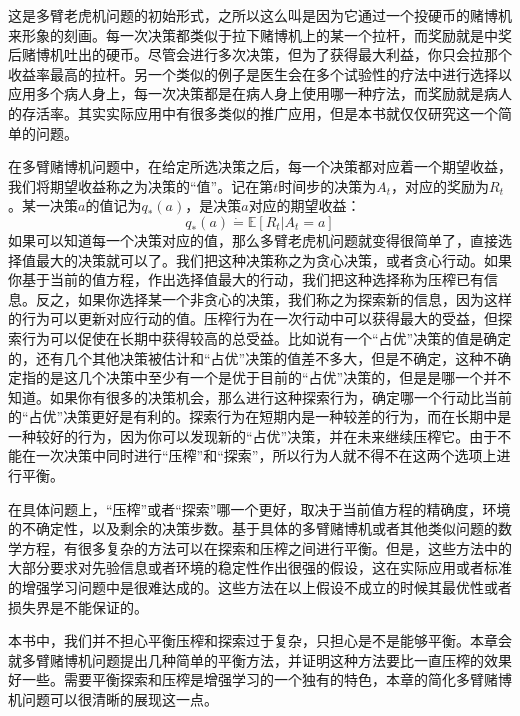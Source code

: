\documentclass{ctexart}
\begin{document}
            这是多臂老虎机问题的初始形式，之所以这么叫是因为它通过一个投硬币的赌博机来形象的刻画。每一次决策都类似于拉下赌博机上的某一个拉杆，而奖励就是中奖后赌博机吐出的硬币。尽管会进行多次决策，但为了获得最大利益，你只会拉那个收益率最高的拉杆。另一个类似的例子是医生会在多个试验性的疗法中进行选择以应用多个病人身上，每一次决策都是在病人身上使用哪一种疗法，而奖励就是病人的存活率。其实实际应用中有很多类似的推广应用，但是本书就仅仅研究这一个简单的问题。

            在多臂赌博机问题中，在给定所选决策之后，每一个决策都对应着一个期望收益，我们将期望收益称之为决策的“值”。记在第$t$时间步的决策为$A_t$，对应的奖励为$R_t$。某一决策$a$的值记为$q_{*}(a)$，是决策$a$对应的期望收益：
            \begin{equation}
                q_{*}(a)\dot{=}\mathbb{E}[R_t|A_t=a]
                \label{e_2}
            \end{equation}
            如果可以知道每一个决策对应的值，那么多臂老虎机问题就变得很简单了，直接选择值最大的决策就可以了。我们把这种决策称之为贪心决策，或者贪心行动。如果你基于当前的值方程，作出选择值最大的行动，我们把这种选择称为压榨已有信息。反之，如果你选择某一个非贪心的决策，我们称之为探索新的信息，因为这样的行为可以更新对应行动的值。压榨行为在一次行动中可以获得最大的受益，但探索行为可以促使在长期中获得较高的总受益。比如说有一个“占优”决策的值是确定的，还有几个其他决策被估计和“占优”决策的值差不多大，但是不确定，这种不确定指的是这几个决策中至少有一个是优于目前的“占优”决策的，但是是哪一个并不知道。如果你有很多的决策机会，那么进行这种探索行为，确定哪一个行动比当前的“占优”决策更好是有利的。探索行为在短期内是一种较差的行为，而在长期中是一种较好的行为，因为你可以发现新的“占优”决策，并在未来继续压榨它。由于不能在一次决策中同时进行“压榨”和“探索”，所以行为人就不得不在这两个选项上进行平衡。

            在具体问题上，“压榨”或者“探索”哪一个更好，取决于当前值方程的精确度，环境的不确定性，以及剩余的决策步数。基于具体的多臂赌博机或者其他类似问题的数学方程，有很多复杂的方法可以在探索和压榨之间进行平衡。但是，这些方法中的大部分要求对先验信息或者环境的稳定性作出很强的假设，这在实际应用或者标准的增强学习问题中是很难达成的。这些方法在以上假设不成立的时候其最优性或者损失界是不能保证的。

            本书中，我们并不担心平衡压榨和探索过于复杂，只担心是不是能够平衡。本章会就多臂赌博机问题提出几种简单的平衡方法，并证明这种方法要比一直压榨的效果好一些。需要平衡探索和压榨是增强学习的一个独有的特色，本章的简化多臂赌博机问题可以很清晰的展现这一点。
\end{document}
